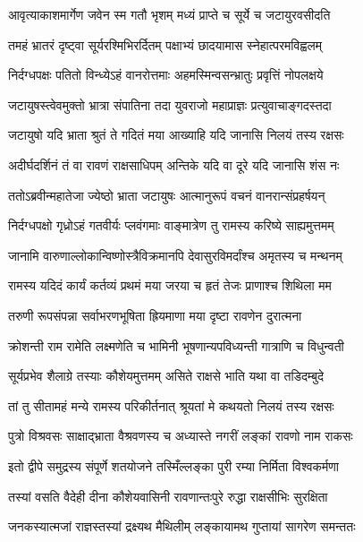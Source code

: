 \twolineshloka
{आवृत्याकाशमार्गेण जवेन स्म गतौ भृशम्}
{मध्यं प्राप्ते च सूर्ये च जटायुरवसीदति} %

\twolineshloka
{तमहं भ्रातरं दृष्ट्वा सूर्यरश्मिभिरर्दितम्}
{पक्षाभ्यं छादयामास स्नेहात्परमविह्वलम्} %

\twolineshloka
{निर्दग्धपक्षः पतितो विन्ध्येऽहं वानरोत्तमाः}
{अहमस्मिन्वसन्भ्रातुः प्रवृत्तिं नोपलक्षये} %

\twolineshloka
{जटायुषस्त्वेवमुक्तो भ्रात्रा संपातिना तदा}
{युवराजो महाप्राज्ञः प्रत्युवाचाङ्गदस्तदा} %

\twolineshloka
{जटायुषो यदि भ्राता श्रुतं ते गदितं मया}
{आख्याहि यदि जानासि निलयं तस्य रक्षसः} %

\twolineshloka
{अदीर्घदर्शिनं तं वा रावणं राक्षसाधिपम्}
{अन्तिके यदि वा दूरे यदि जानासि शंस नः} %

\twolineshloka
{ततोऽब्रवीन्महातेजा ज्येष्ठो भ्राता जटायुषः}
{आत्मानुरूपं वचनं वानरान्संप्रहर्षयन्} %

\twolineshloka
{निर्दग्धपक्षो गृध्रोऽहं गतवीर्यः प्लवंगमाः}
{वाङ्मात्रेण तु रामस्य करिष्ये साह्यमुत्तमम्} %

\twolineshloka
{जानामि वारुणाल्लोकान्विष्णोस्त्रैविक्रमानपि}
{देवासुरविमर्दांश्च अमृतस्य च मन्थनम्} %

\twolineshloka
{रामस्य यदिदं कार्यं कर्तव्यं प्रथमं मया}
{जरया च हृतं तेजः प्राणाश्च शिथिला मम} %

\twolineshloka
{तरुणी रूपसंपन्ना सर्वाभरणभूषिता}
{ह्रियमाणा मया दृष्टा रावणेन दुरात्मना} %

\twolineshloka
{क्रोशन्ती राम रामेति लक्ष्मणेति च भामिनी}
{भूषणान्यपविध्यन्ती गात्राणि च विधुन्वती} %

\twolineshloka
{सूर्यप्रभेव शैलाग्रे तस्याः कौशेयमुत्तमम्}
{असिते राक्षसे भाति यथा वा तडिदम्बुदे} %

\twolineshloka
{तां तु सीतामहं मन्ये रामस्य परिकीर्तनात्}
{श्रूयतां मे कथयतो निलयं तस्य रक्षसः} %

\twolineshloka
{पुत्रो विश्रवसः साक्षाद्भ्राता वैश्रवणस्य च}
{अध्यास्ते नगरीं लङ्कां रावणो नाम राकसः} %

\twolineshloka
{इतो द्वीपे समुद्रस्य संपूर्णे शतयोजने}
{तस्मिँल्लङ्का पुरी रम्या निर्मिता विश्वकर्मणा} %

\twolineshloka
{तस्यां वसति वैदेही दीना कौशेयवासिनी}
{रावणान्तःपुरे रुद्धा राक्षसीभिः सुरक्षिता} %

\twolineshloka
{जनकस्यात्मजां राज्ञस्तस्यां द्रक्ष्यथ मैथिलीम्}
{लङ्कायामथ गुप्तायां सागरेण समन्ततः} %


